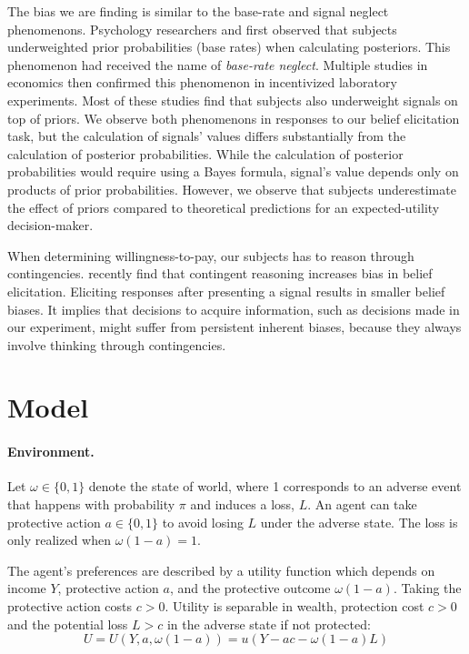 \documentclass[12pt,a4paper]{article}
\begin{document}
The bias we are finding is similar to the base-rate and signal neglect phenomenons. Psychology researchers \citet{hammerton_case_1973} and \citet{kahneman_psychology_1973} first observed that subjects underweighted prior probabilities (base rates) when calculating posteriors. This phenomenon had received the name of \textit{base-rate neglect}. Multiple studies in economics then confirmed \citep*{grether_testing_1992, holt_update_2009} this phenomenon in incentivized laboratory experiments. Most of these studies find that subjects also underweight signals on top of priors.  We observe both phenomenons in responses to our belief elicitation task, but the calculation of signals' values differs substantially from the calculation of posterior probabilities. While the calculation of posterior probabilities would require using a Bayes formula, signal's value depends only on products of prior probabilities. However, we observe that subjects underestimate the effect of priors compared to theoretical predictions for an expected-utility decision-maker.

When determining willingness-to-pay, our subjects has to reason through contingencies. \citet{aina_contingent_2023} recently find that contingent reasoning increases bias in belief elicitation. Eliciting responses after presenting a signal results in smaller belief biases.  It implies that decisions to acquire information, such as decisions made in our experiment, might suffer from persistent inherent biases, because they always involve thinking through contingencies.

\vspace{20pt}
\section{Model}
\paragraph{Environment.} Let $\omega \in \{0,1\}$ denote the state of world, where 1 corresponds to an adverse event that happens with probability $\pi$ and induces a loss, $L$. An agent can take protective action $a\in\{0,1\}$ to avoid losing $L$ under the adverse state. The loss is only realized when $\omega(1-a)=1$.

The agent's preferences are described by a utility function which depends on income $Y$, protective action $a$, and the protective outcome $\omega(1-a)$. Taking the protective action costs $c>0$. Utility is separable in wealth, protection cost $c>0$ and the potential loss $L>c$ in the adverse state if not protected:
\[
U=U(Y,a,\omega(1-a))=u(Y-ac-\omega(1-a)L)
\]
\end{document}
